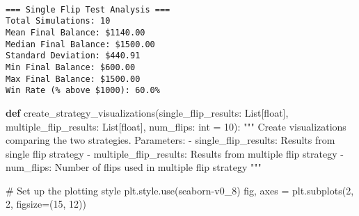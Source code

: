 \documentclass[
  letterpaper,
  DIV=11,
  numbers=noendperiod]{scrartcl}
\newenvironment{Shaded}{\begin{snugshade}}{\end{snugshade}}
\newcommand{\BuiltInTok}[1]{\textcolor[rgb]{0.00,0.23,0.31}{#1}}
\newcommand{\CommentTok}[1]{\textcolor[rgb]{0.37,0.37,0.37}{#1}}
\newcommand{\DecValTok}[1]{\textcolor[rgb]{0.68,0.00,0.00}{#1}}
\newcommand{\KeywordTok}[1]{\textcolor[rgb]{0.00,0.23,0.31}{\textbf{#1}}}
\newcommand{\NormalTok}[1]{\textcolor[rgb]{0.00,0.23,0.31}{#1}}
\newcommand{\OperatorTok}[1]{\textcolor[rgb]{0.37,0.37,0.37}{#1}}
\newcommand{\StringTok}[1]{\textcolor[rgb]{0.13,0.47,0.30}{#1}}
\begin{document}
\begin{verbatim}

=== Single Flip Test Analysis ===
Total Simulations: 10
Mean Final Balance: $1140.00
Median Final Balance: $1500.00
Standard Deviation: $440.91
Min Final Balance: $600.00
Max Final Balance: $1500.00
Win Rate (% above $1000): 60.0%
\end{verbatim}

\label{visualization-setup}
\begin{Shaded}
\begin{Highlighting}[]
\KeywordTok{def}\NormalTok{ create\_strategy\_visualizations(single\_flip\_results: List[}\BuiltInTok{float}\NormalTok{], }
\NormalTok{                                 multiple\_flip\_results: List[}\BuiltInTok{float}\NormalTok{],}
\NormalTok{                                 num\_flips: }\BuiltInTok{int} \OperatorTok{=} \DecValTok{10}\NormalTok{):}
    \CommentTok{"""}
\CommentTok{    Create visualizations comparing the two strategies.}
\CommentTok{    }
\CommentTok{    Parameters:}
\CommentTok{    {-} single\_flip\_results: Results from single flip strategy}
\CommentTok{    {-} multiple\_flip\_results: Results from multiple flip strategy}
\CommentTok{    {-} num\_flips: Number of flips used in multiple flip strategy}
\CommentTok{    """}
    
    \CommentTok{\# Set up the plotting style}
\NormalTok{    plt.style.use(}\StringTok{\textquotesingle{}seaborn{-}v0\_8\textquotesingle{}}\NormalTok{)}
\NormalTok{    fig, axes }\OperatorTok{=}\NormalTok{ plt.subplots(}\DecValTok{2}\NormalTok{, }\DecValTok{2}\NormalTok{, figsize}\OperatorTok{=}\NormalTok{(}\DecValTok{15}\NormalTok{, }\DecValTok{12}\NormalTok{))}
    

\end{Highlighting}
\end{Shaded}
\end{document}
